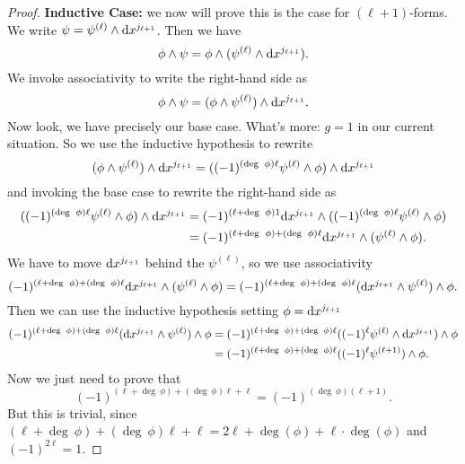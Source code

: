 \begin{proof}
  \textbf{Inductive Case:}
  we now will prove this is the case for $(\ell+1)$-forms.
  We write $\psi=\psi^{(\ell)}\wedge\mathrm{d} x^{j_{\ell+1}}$. Then we have
  \begin{equation}
\phi\wedge\psi = \phi\wedge(\psi^{(\ell)}\wedge\mathrm{d} x^{j_{\ell+1}}).
  \end{equation}
  We invoke associativity to write the right-hand side as
  \begin{equation}
\phi\wedge\psi = (\phi\wedge\psi^{(\ell)})\wedge\mathrm{d} x^{j_{\ell+1}}.
  \end{equation}
  Now look, we have precisely our base case. What's more: $g=1$ in our
  current situation. So we use the inductive hypothesis to rewrite
  \begin{equation}
    (\phi\wedge\psi^{(\ell)})\wedge\mathrm{d} x^{j_{\ell+1}}
    = ((-1)^{(\operatorname{deg}~\phi)\ell}\psi^{(\ell)}\wedge\phi)\wedge\mathrm{d} x^{j_{\ell+1}}
  \end{equation}
  and invoking the base case to rewrite the right-hand side as
  \begin{equation}
    \begin{split}
    ((-1)^{(\operatorname{deg}~\phi)\ell}\psi^{(\ell)}\wedge\phi)\wedge\mathrm{d} x^{j_{\ell+1}}
    &= (-1)^{(\ell + \operatorname{deg}~\phi)1}\mathrm{d} x^{j_{\ell+1}}\wedge((-1)^{(\operatorname{deg}~\phi)\ell}\psi^{(\ell)}\wedge\phi)\\
&= (-1)^{(\ell + \operatorname{deg}~\phi)+(\operatorname{deg}~\phi)\ell}\mathrm{d} x^{j_{\ell+1}}\wedge(\psi^{(\ell)}\wedge\phi).
    \end{split}
    \end{equation}
  We have to move $\mathrm{d} x^{j_{\ell+1}}$ behind the $\psi^{(\ell)}$, so we
  use associativity
  \begin{equation}
(-1)^{(\ell + \operatorname{deg}~\phi)+(\operatorname{deg}~\phi)\ell}\mathrm{d} x^{j_{\ell+1}}\wedge(\psi^{(\ell)}\wedge\phi)
=(-1)^{(\ell + \operatorname{deg}~\phi)+(\operatorname{deg}~\phi)\ell}(\mathrm{d} x^{j_{\ell+1}}\wedge\psi^{(\ell)})\wedge\phi.
  \end{equation}
  Then we can use the inductive hypothesis setting $\phi=\mathrm{d} x^{j_{\ell+1}}$ 
  \begin{equation}
    \begin{split}
(-1)^{(\ell + \operatorname{deg}~\phi)+(\operatorname{deg}~\phi)\ell}(\mathrm{d} x^{j_{\ell+1}}\wedge\psi^{(\ell)})\wedge\phi&=(-1)^{(\ell + \operatorname{deg}~\phi)+(\operatorname{deg}~\phi)\ell}((-1)^{\ell}\psi^{(\ell)}\wedge\mathrm{d} x^{j_{\ell+1}})\wedge\phi\\
&=(-1)^{(\ell + \operatorname{deg}~\phi)+(\operatorname{deg}~\phi)\ell}((-1)^{\ell}\psi^{(\ell+1)})\wedge\phi.
    \end{split}
  \end{equation}
  Now we just need to prove that
  \begin{equation}
(-1)^{(\ell + \deg~\phi)+(\deg~\phi)\ell + \ell} = (-1)^{(\deg~\phi)(\ell+1)}.
  \end{equation}
  But this is trivial, since
  $(\ell + \deg~\phi)+(\deg~\phi)\ell + \ell = 2\ell + \deg(\phi) + \ell\cdot\deg(\phi)$
  and $(-1)^{2\ell}=1$.
\end{proof}

